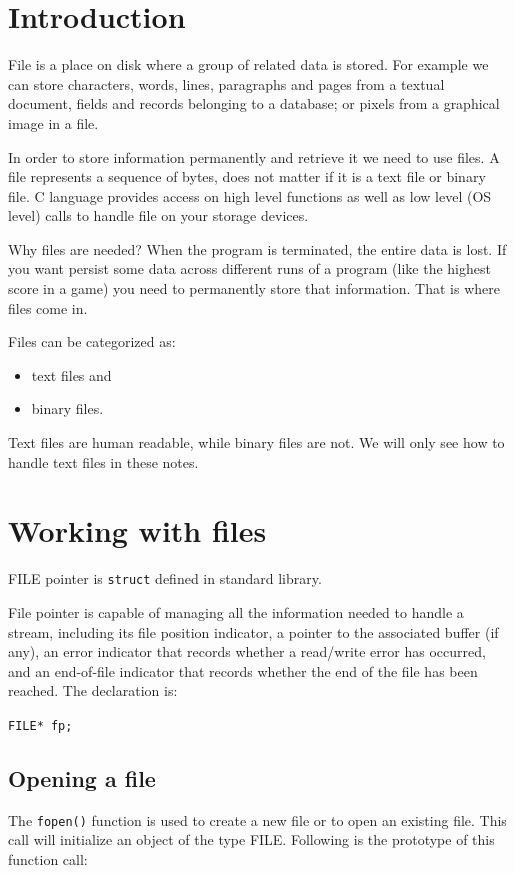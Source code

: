 \documentclass[11pt,a4paper]{article}
\author{TalentSprint}
\date{}
\begin{document}
\section*{Introduction}
File is a place on disk where a group of related data is stored. For example we can store characters, words, lines, paragraphs and pages from a textual document, fields and records belonging to a database; or pixels from a graphical image in a file.

In order to store information permanently and retrieve it  we need to use files. A file represents a sequence of bytes, does not matter if it is a text file or binary file. C language provides access on high level functions as well as low level (OS level) calls to handle file on your storage devices.

Why files are needed? When the program is terminated, the entire data is lost. If you want persist some data across different runs of a program (like the highest score in a game) you need to permanently store that information. That is where files come in. 

Files can be categorized as: 
\begin{itemize}
  \item text files and 
  \item binary files.
\end{itemize}

Text files are human readable, while binary files are not. We will only see how to handle text files in these notes.

\section*{Working with files}
FILE pointer is \texttt{struct} defined in standard library.

File pointer is capable of managing all the information needed to handle a stream, including its file position indicator, a pointer to the associated buffer (if any), an error indicator that records whether a read/write error has occurred, and an end-of-file indicator that records whether the end of the file has been reached. The declaration is: 

\lstinline!FILE* fp;! 

\subsection*{Opening a file} 
The \texttt{fopen()} function is used to create a new file or to open an existing file. This call will initialize an object of the type FILE. Following is the prototype of this function call:
\end{document}
